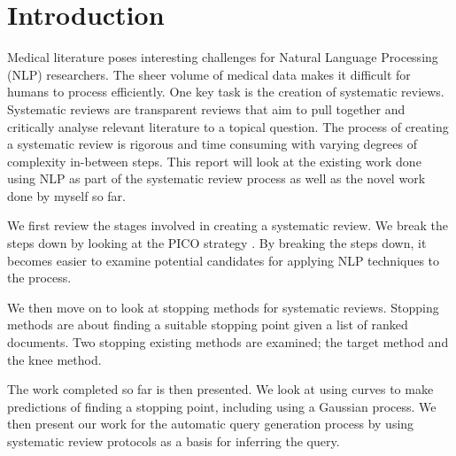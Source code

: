 \chapter{Introduction}

Medical literature poses interesting challenges for Natural Language Processing (NLP) researchers. The sheer volume of medical data makes it difficult for humans to process efficiently. One key task is the creation of systematic reviews. Systematic reviews are transparent reviews that aim to pull together and critically analyse relevant literature to a topical question. The process of creating a systematic review is rigorous and time consuming with varying degrees of complexity in-between steps. This report will look at the existing  work done using NLP as part of the systematic review process as well as the novel work done by myself so far.


We first review the stages involved in creating a systematic review. We break the steps down by looking at the PICO strategy \cite{pico}. By breaking the steps down, it becomes easier to examine potential candidates for applying NLP techniques to the process.

We then move on to look at stopping methods for systematic reviews. Stopping methods are about finding a suitable stopping point given a list of ranked documents. Two stopping existing methods are examined; the target method and the knee method. 

The work completed so far is then presented. We look at using curves to make predictions of finding a stopping point, including using a Gaussian process. We then present our work for the automatic query generation process by using systematic review protocols as a basis for inferring the query.


